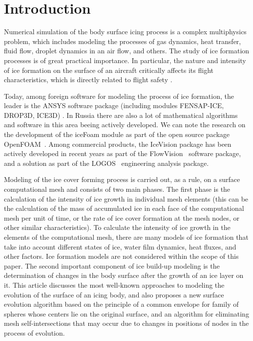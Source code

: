 \documentclass[
11pt,
tightenlines,
twoside,
onecolumn,
nofloats,
nobibnotes,
nofootinbib,
superscriptaddress,
noshowpacs,
centertags]
{revtex4}
\begin{document}

\maketitle


\section{Introduction}

Numerical simulation of the body surface icing process is a complex multiphysics problem, which includes modeling the processes of gas dynamics, heat transfer, fluid flow, droplet dynamics in an air flow, and others.
The study of ice formation processes is of great practical importance.
In particular, the nature and intensity of ice formation on the surface of an aircraft critically affects its flight characteristics, which is directly related to flight safety \cite{Raj}.

Today, among foreign software for modeling the process of ice formation, the leader is the ANSYS software package (including modules FENSAP-ICE, DROP3D, ICE3D) \cite{Martini}.
In Russia there are also a lot of mathematical algorithms and software in this area beeing actively developed.
We can note the research on the development of the iceFoam module as part of the open source package OpenFOAM~\cite{Strijhak}.
Among commercial products, the IceVision package has been actively developed in recent years as part of the FlowVision~\cite{Sorokin} software package, and a solution as part of the LOGOS~\cite{Galanov} engineering analysis package.

Modeling of the ice cover forming process is carried out, as a rule, on a surface computational mesh and consists of two main phases.
The first phase is the calculation of the intensity of ice growth in individual mesh elements (this can be the calculation of the mass of accumulated ice in each face of the computational mesh per unit of time, or the rate of ice cover formation at the mesh nodes, or other similar characteristics).
To calculate the intensity of ice growth in the elements of the computational mesh, there are many models of ice formation \cite{Bartkus,Zhang,Pena} that take into account different states of ice, water film dynamics, heat fluxes, and other factors.
Ice formation models are not considered within the scope of this paper.
The second important component of ice build-up modeling is the determination of changes in the body surface after the growth of an ice layer on it.
This article discusses the most well-known approaches to modeling the evolution of the surface of an icing body, and also proposes a new surface evolution algorithm based on the principle of a common envelope for family of spheres whose centers lie on the original surface, and an algorithm for eliminating mesh self-intersections that may occur due to changes in positions of nodes in the process of evolution.
\end{document}
